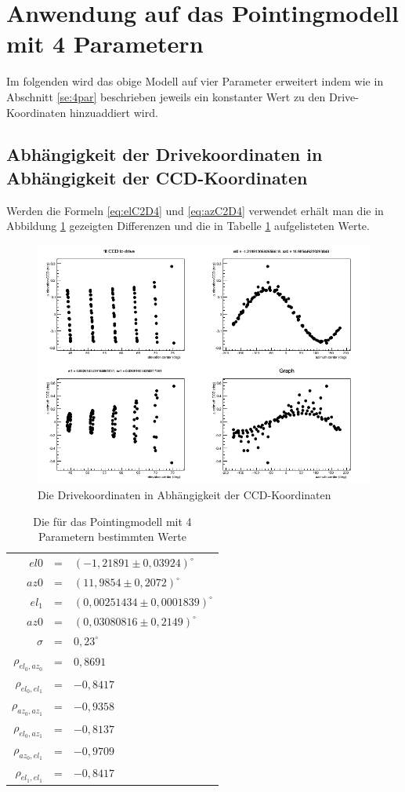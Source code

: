 \section{Anwendung auf das Pointingmodell mit 4 Parametern}
Im folgenden wird das obige Modell auf vier Parameter erweitert indem wie in Abschnitt \ref{se:4par} beschrieben jeweils ein konstanter Wert zu den Drive-Koordinaten hinzuaddiert wird.
\subsection{Abhängigkeit der Drivekoordinaten in Abhängigkeit der CCD-Koordinaten}
Werden die Formeln \ref{eq:elC2D4} und \ref{eq:azC2D4} verwendet erhält man die in Abbildung \ref{img:C2D4} gezeigten Differenzen und die in Tabelle \ref{tab:C2D4} aufgelisteten Werte.
\begin{figure}[htbp]
\centering
\includegraphics[width=\textwidth]{../341/run341C2D_4par.png}
\caption{Die Drivekoordinaten in Abhängigkeit der CCD-Koordinaten}
\label{img:C2D4}
\end{figure}
\begin{table}[htbp]
\centering
\begin{tabular}{rcl}
\toprule
$el0$ &=& $(-1,21891\pm 0,03924)^{\circ}$\\
$az0$ &=& $(11,9854\pm0,2072)^{\circ}$\\
$el_1$ &=& $(0,00251434\pm 0,0001839)^{\circ}$\\
$az0$ &=& $(0,03080816\pm0,2149)^{\circ}$\\
$\sigma$ &=& $0,23^{\circ}$\\
$\rho_{el_0,az_0}$ &=& $0,8691$\\
$\rho_{el_0,el_1}$ &=& $-0,8417$\\
$\rho_{az_0,az_1}$ &=& $-0,9358$\\
$\rho_{el_0,az_1}$ &=& $-0,8137$\\
$\rho_{az_0,el_1}$ &=& $-0,9709$\\
$\rho_{el_1,el_1}$ &=& $-0,8417$\\
\bottomrule
\end{tabular}
\label{tab:C2D4}
\caption{Die für das Pointingmodell mit 4 Parametern bestimmten Werte}
\end{table}

